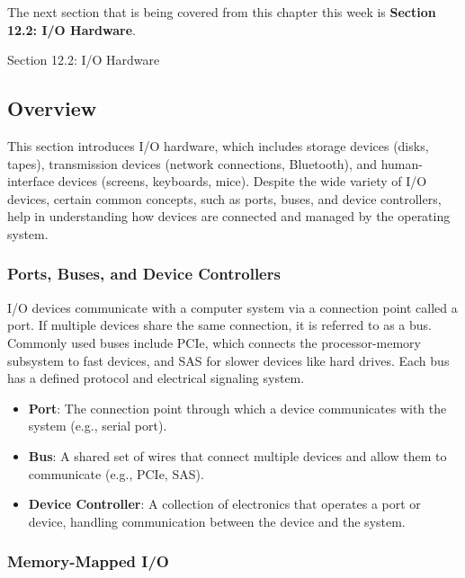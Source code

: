The next section that is being covered from this chapter this week is \textbf{Section 12.2: I/O Hardware}.

\begin{notes}{Section 12.2: I/O Hardware}
    \subsection*{Overview}

    This section introduces I/O hardware, which includes storage devices (disks, tapes), transmission devices (network connections, Bluetooth), and human-interface devices (screens, keyboards, mice). 
    Despite the wide variety of I/O devices, certain common concepts, such as ports, buses, and device controllers, help in understanding how devices are connected and managed by the operating system.
    
    \subsubsection*{Ports, Buses, and Device Controllers}
    
    I/O devices communicate with a computer system via a connection point called a port. If multiple devices share the same connection, it is referred to as a bus. Commonly used buses include PCIe, 
    which connects the processor-memory subsystem to fast devices, and SAS for slower devices like hard drives. Each bus has a defined protocol and electrical signaling system.
    
    \begin{highlight}
    
        \begin{itemize}
            \item \textbf{Port}: The connection point through which a device communicates with the system (e.g., serial port).
            \item \textbf{Bus}: A shared set of wires that connect multiple devices and allow them to communicate (e.g., PCIe, SAS).
            \item \textbf{Device Controller}: A collection of electronics that operates a port or device, handling communication between the device and the system.
        \end{itemize}
    
    \end{highlight}
    
    \subsubsection*{Memory-Mapped I/O}
    

\end{notes}
